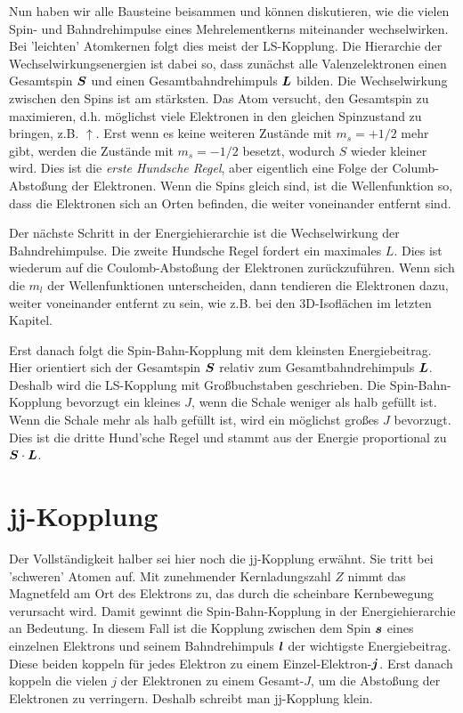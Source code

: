 Nun haben wir alle Bausteine beisammen und können diskutieren, wie die vielen Spin- und Bahndrehimpulse eines Mehrelementkerns miteinander wechselwirken. Bei 'leichten' Atomkernen folgt dies meist der LS-Kopplung. Die Hierarchie der Wechselwirkungsenergien ist dabei so, dass zunächst alle Valenzelektronen einen Gesamtspin $\boldsymbol{S}$ und einen Gesamtbahndrehimpuls $\boldsymbol{L}$ bilden. Die Wechselwirkung zwischen den Spins ist am stärksten. Das Atom versucht, den Gesamtspin zu maximieren, d.h. möglichst viele Elektronen in den gleichen Spinzustand zu bringen, z.B. $\uparrow$. Erst wenn es keine weiteren Zustände mit $m_s = +1/2$ mehr gibt, werden die Zustände mit $m_s = -1/2$ besetzt, wodurch $S$ wieder kleiner wird. Dies ist die \emph{erste Hundsche Regel}, aber eigentlich eine Folge der Columb-Abstoßung der Elektronen. Wenn die Spins gleich sind, ist die Wellenfunktion so, dass die Elektronen sich an Orten befinden, die weiter voneinander entfernt sind.

Der nächste Schritt in der Energiehierarchie ist die Wechselwirkung der Bahndrehimpulse. Die zweite Hundsche Regel fordert ein maximales $L$. Dies ist wiederum auf die Coulomb-Abstoßung der Elektronen zurückzuführen. Wenn sich die $m_l$ der Wellenfunktionen unterscheiden, dann tendieren die Elektronen dazu, weiter voneinander entfernt zu sein, wie z.B. bei den 3D-Isoflächen im letzten Kapitel.

Erst danach folgt die Spin-Bahn-Kopplung mit dem kleinsten Energiebeitrag. Hier orientiert sich der Gesamtspin $\boldsymbol{S}$ relativ zum Gesamtbahndrehimpuls $\boldsymbol{L}$. Deshalb wird die LS-Kopplung mit Großbuchstaben geschrieben. Die Spin-Bahn-Kopplung bevorzugt ein kleines $J$, wenn die Schale weniger als halb gefüllt ist. Wenn die Schale mehr als halb gefüllt ist, wird ein möglichst großes $J$ bevorzugt. Dies ist die dritte Hund'sche Regel und stammt aus der Energie  proportional zu $\boldsymbol{S} \cdot \boldsymbol{L}$.

\section{jj-Kopplung}

Der Vollständigkeit halber sei hier noch die jj-Kopplung erwähnt. Sie tritt bei 'schweren' Atomen auf. Mit zunehmender Kernladungszahl $Z$ nimmt das Magnetfeld am Ort des Elektrons zu, das durch die scheinbare Kernbewegung verursacht wird. Damit gewinnt die Spin-Bahn-Kopplung in der Energiehierarchie an Bedeutung. In diesem Fall ist die Kopplung zwischen dem Spin $\boldsymbol{s}$ eines einzelnen Elektrons und seinem Bahndrehimpuls $\boldsymbol{l}$ der wichtigste Energiebeitrag. Diese beiden koppeln für jedes Elektron zu einem Einzel-Elektron-$\boldsymbol{j}$. Erst danach koppeln die vielen $j$ der Elektronen zu einem Gesamt-$J$, um die Abstoßung der Elektronen zu verringern. Deshalb schreibt man jj-Kopplung klein.


